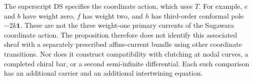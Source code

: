 The superscript $\mathrm{DS}$ specifies the coordinate action, which uses $T$.
For example, $e$ and $b$ have weight zero, $f$ has weight two, and $h$ has third-order conformal pole $-2k\mathbf1$.
These are not the three weight-one primary currents of the Sugawara coordinate action.
The proposition therefore does not identify this associated sheaf with a separately prescribed affine-current bundle using other coordinate transitions.
Nor does it construct compatibility with clutching at nodal curves, a completed chiral bar, or a second semi-infinite differential.
Each such comparison has an additional carrier and an additional intertwining equation.
